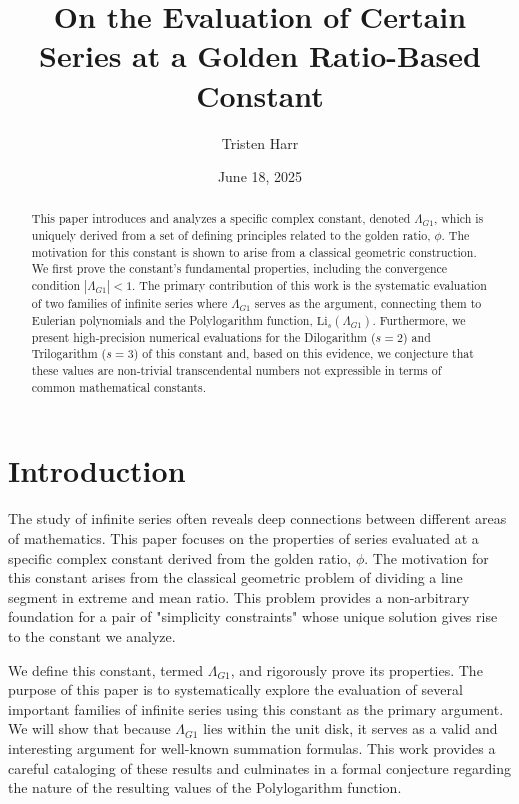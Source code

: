 \documentclass{amsart}
\theoremstyle{plain}
\theoremstyle{definition}
\theoremstyle{remark}
\newcommand{\LambdaG}{\Lambda_{G1}}
\begin{document}
\title[Series Evaluations at a Golden Ratio Constant]{On the Evaluation of Certain Series at a Golden Ratio-Based Constant}
\author{Tristen Harr}
\address{Saint Charles, Missouri, USA}
\date{June 18, 2025}

\begin{abstract}
This paper introduces and analyzes a specific complex constant, denoted $\Lambda_{G1}$, which is uniquely derived from a set of defining principles related to the golden ratio, $\phi$. The motivation for this constant is shown to arise from a classical geometric construction. We first prove the constant's fundamental properties, including the convergence condition $|\LambdaG| < 1$. The primary contribution of this work is the systematic evaluation of two families of infinite series where $\LambdaG$ serves as the argument, connecting them to Eulerian polynomials and the Polylogarithm function, $\mathrm{Li}_s(\LambdaG)$. Furthermore, we present high-precision numerical evaluations for the Dilogarithm ($s=2$) and Trilogarithm ($s=3$) of this constant and, based on this evidence, we conjecture that these values are non-trivial transcendental numbers not expressible in terms of common mathematical constants.
\end{abstract}

\maketitle

\section{Introduction}
The study of infinite series often reveals deep connections between different areas of mathematics. This paper focuses on the properties of series evaluated at a specific complex constant derived from the golden ratio, $\phi$. The motivation for this constant arises from the classical geometric problem of dividing a line segment in extreme and mean ratio. This problem provides a non-arbitrary foundation for a pair of "simplicity constraints" whose unique solution gives rise to the constant we analyze.

We define this constant, termed $\LambdaG$, and rigorously prove its properties. The purpose of this paper is to systematically explore the evaluation of several important families of infinite series using this constant as the primary argument. We will show that because $\LambdaG$ lies within the unit disk, it serves as a valid and interesting argument for well-known summation formulas. This work provides a careful cataloging of these results and culminates in a formal conjecture regarding the nature of the resulting values of the Polylogarithm function.
\end{document}
